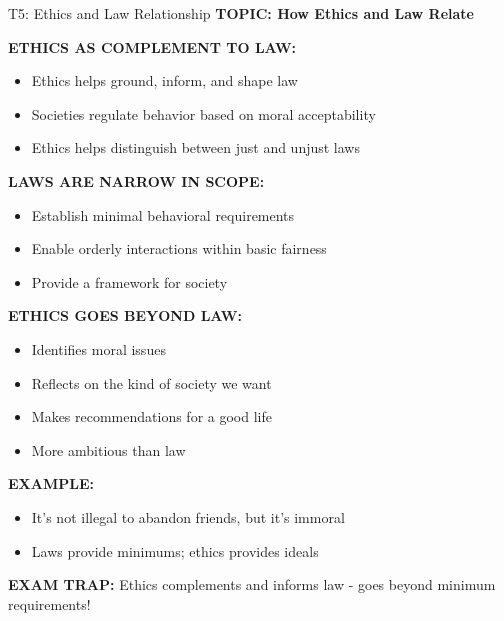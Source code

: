 \documentclass[8pt]{beamer}
\begin{document}
	\begin{frame}{T5: Ethics and Law Relationship}
		\fontsize{6.5}{7.5}\selectfont
		\textbf{TOPIC: How Ethics and Law Relate}
		
		\vspace{0.1cm}
		\textbf{ETHICS AS COMPLEMENT TO LAW:}
		\begin{itemize}
			\item Ethics helps ground, inform, and shape law
			\item Societies regulate behavior based on moral acceptability
			\item Ethics helps distinguish between just and unjust laws
		\end{itemize}
		
		\vspace{0.1cm}
		\textbf{LAWS ARE NARROW IN SCOPE:}
		\begin{itemize}
			\item Establish minimal behavioral requirements
			\item Enable orderly interactions within basic fairness
			\item Provide a framework for society
		\end{itemize}
		
		\vspace{0.1cm}
		\textbf{ETHICS GOES BEYOND LAW:}
		\begin{itemize}
			\item Identifies moral issues
			\item Reflects on the kind of society we want
			\item Makes recommendations for a good life
			\item More ambitious than law
		\end{itemize}
		
		\vspace{0.1cm}
		\textbf{EXAMPLE:}
		\begin{itemize}
			\item It's not illegal to abandon friends, but it's immoral
			\item Laws provide minimums; ethics provides ideals
		\end{itemize}
		
		\textcolor{myred}{\textbf{EXAM TRAP:}} Ethics \textcolor{myblue}{complements and informs} law - goes beyond minimum requirements!
	\end{frame}
	
	
\end{document}
